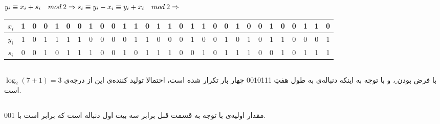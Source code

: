 \documentclass{article}
\begin{document}
\section{}%

\begin{latin}
$
y_i \equiv x_i + s_i \quad mod\:2 \\ \Rightarrow 
s_i \equiv y_i - x_i \equiv y_i + x_i \quad mod\:2 \\ \Rightarrow 
$
\begin{longtable}[c]{c|c|c|c|c|c|c|c|c|c|c|c|c|c|c|c|c|c|c|c|c|c|c|c|c|c|c|c|c|}
\cline{2-29}
$x_i$ & 1 & 0 & 0 & 1 & 0 & 0 & 1 & 0 & 0 & 1 & 1 & 0 & 1 & 1 & 0 & 1 & 1 & 0 & 0 & 1 & 0 & 0 & 1 & 0 & 0 & 1 & 1 & 0 \\ \cline{2-29} 
\endfirsthead
%
\endhead
%
$y_i$ & 1 & 0 & 1 & 1 & 1 & 1 & 0 & 0 & 0 & 0 & 1 & 1 & 0 & 0 & 0 & 1 & 0 & 0 & 1 & 0 & 1 & 0 & 1 & 1 & 0 & 0 & 0 & 1 \\ \cline{2-29} 
$s_i$ & 0 & 0 & 1 & 0 & 1 & 1 & 1 & 0 & 0 & 1 & 0 & 1 & 1 & 1 & 0 & 0 & 1 & 0 & 1 & 1 & 1 & 0 & 0 & 1 & 0 & 1 & 1 & 1 \\ \cline{2-29} 
\end{longtable}
\end{latin}

\subsection{}
با فرض  بودن ِ، و با توجه به اینکه دنباله‌ی به طول هفتِ 0010111 چهار بار تکرار شده است، احتمالا  تولید کننده‌ی این  از درجه‌ی $\log_2 \left( 7 + 1 \right) = 3$ است.

\subsection{}
مقدار اولیه‌ی  با توجه به قسمت قبل برابر سه بیت اول دنباله است که برابر است با 001.
\end{document}

